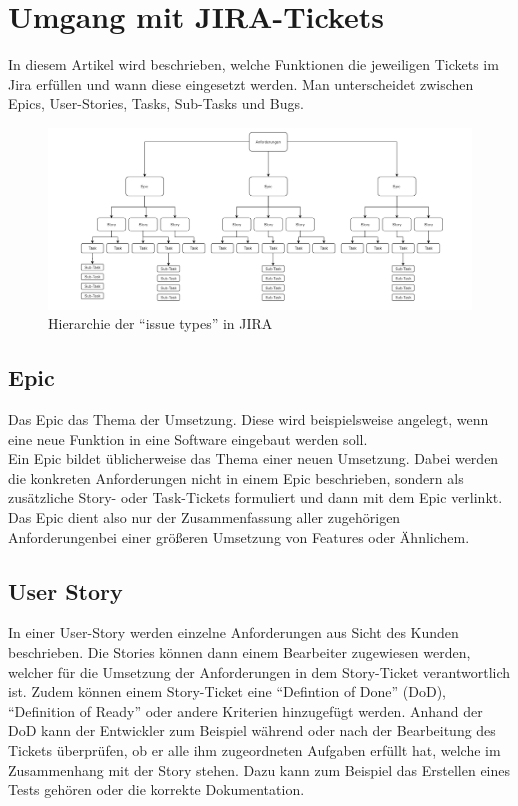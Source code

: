 \section{Umgang mit JIRA-Tickets}
In diesem Artikel wird beschrieben, welche Funktionen die jeweiligen Tickets im Jira erfüllen und wann diese eingesetzt werden. Man unterscheidet zwischen Epics, User-Stories, Tasks, Sub-Tasks und Bugs.
\begin{figure}[!ht]
	\centering
	\includegraphics[width=\textwidth]{./ressourcen/jira-hierarchie.png}
	\caption{Hierarchie der "`issue types"' in JIRA}
\end{figure}

\subsection{Epic}
Das Epic das Thema der Umsetzung. Diese wird beispielsweise angelegt, wenn eine neue Funktion in eine Software eingebaut werden soll.\cite{atlassian:jira-support} \\
Ein Epic bildet üblicherweise das Thema einer neuen Umsetzung. Dabei werden die konkreten Anforderungen nicht in einem Epic beschrieben, sondern als zusätzliche Story- oder Task-Tickets formuliert und dann mit dem Epic verlinkt. Das Epic dient also nur der Zusammenfassung aller zugehörigen Anforderungenbei einer größeren Umsetzung von Features oder Ähnlichem.\cite{atlassian:jira-support}

\subsection{User Story}
In einer User-Story werden einzelne Anforderungen aus Sicht des Kunden beschrieben. Die Stories können dann einem Bearbeiter zugewiesen werden, welcher für die Umsetzung der Anforderungen in dem Story-Ticket verantwortlich ist. Zudem können einem Story-Ticket eine "`Defintion of Done"' (DoD), "`Definition of Ready"'  oder andere Kriterien hinzugefügt werden. Anhand der DoD kann der Entwickler zum Beispiel während oder nach der Bearbeitung des Tickets überprüfen, ob er alle ihm zugeordneten Aufgaben erfüllt hat, welche im Zusammenhang mit der Story stehen. Dazu kann zum Beispiel das Erstellen eines Tests gehören oder die korrekte Dokumentation. \cite{scrum-guide}

